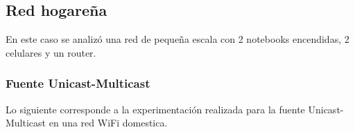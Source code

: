 \subsection{Red hogareña}

En este caso se analizó una red de pequeña escala con 2 notebooks encendidas,
2 celulares y un router.

\subsubsection{Fuente Unicast-Multicast}

 Lo siguiente corresponde a la experimentación realizada para la fuente
 Unicast-Multicast en una red WiFi domestica.
 
\begin{figure}[hp!]
	\begin{minipage}[b]{0.9\linewidth}
	\end{minipage}
\end{figure}


